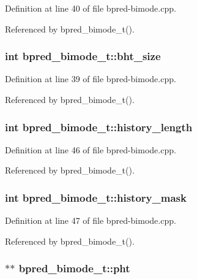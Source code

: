 Definition at line 40 of file bpred-bimode.cpp.

Referenced by bpred\_\-bimode\_\-t().
\subsubsection[{bht\_\-size}]{\setlength{\rightskip}{0pt plus 5cm}int {\bf bpred\_\-bimode\_\-t::bht\_\-size}\hspace{0.3cm}{\tt  [protected]}}\label{classbpred__bimode__t_4b1410098b8967d9306e3c65c7fce07a}




Definition at line 39 of file bpred-bimode.cpp.

Referenced by bpred\_\-bimode\_\-t().
\subsubsection[{history\_\-length}]{\setlength{\rightskip}{0pt plus 5cm}int {\bf bpred\_\-bimode\_\-t::history\_\-length}\hspace{0.3cm}{\tt  [protected]}}\label{classbpred__bimode__t_ac38e5be0149677c934a811d5653658b}




Definition at line 46 of file bpred-bimode.cpp.

Referenced by bpred\_\-bimode\_\-t().
\subsubsection[{history\_\-mask}]{\setlength{\rightskip}{0pt plus 5cm}int {\bf bpred\_\-bimode\_\-t::history\_\-mask}\hspace{0.3cm}{\tt  [protected]}}\label{classbpred__bimode__t_91f293cee81a59af2ec35ad346daa924}




Definition at line 47 of file bpred-bimode.cpp.

Referenced by bpred\_\-bimode\_\-t().
\subsubsection[{pht}]{$\ast$$\ast$ {\bf bpred\_\-bimode\_\-t::pht}\hspace{0.3cm}{\tt  [protected]}}\label{classbpred__bimode__t_dcfe4773ef519f1424be5941bb98eacf}




